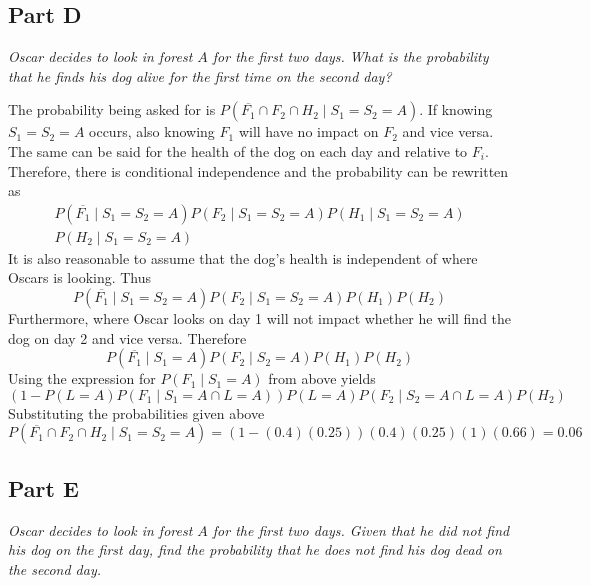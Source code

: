 \documentclass{article}
\begin{document}
\subsection*{Part D}

\textit{Oscar decides to look in forest $ A $ for the first two days. What is
the probability that he finds his dog alive for the first time on the second
day?}

\bigbreak

The probability being asked for is $ P ( \overline{F_1} \cap F_2 \cap H_2 \mid
S_1 = S_2 = A) $. If knowing $ S_1 = S_2 = A $ occurs, also knowing $ F_1 $ will
have no impact on $ F_2 $ and vice versa. The same can be said for the health of
the dog on each day and relative to $ F_i $. Therefore, there is conditional
independence and the probability can be rewritten as
\begin{align*}
    P(\overline{F_1} \mid S_1 = S_2 = A) P(F_2 \mid S_1 = S_2 = A) P(H_1 \mid
    S_1 = S_2 = A) \\
    P(H_2 \mid S_1 = S_2 = A)
\end{align*}
It is also reasonable to assume that the dog's health is independent of where
Oscars is looking. Thus
$$ P(\overline{F_1} \mid S_1 = S_2 = A) P(F_2 \mid S_1 = S_2 = A) P(H_1) P(H_2)
$$
Furthermore, where Oscar looks on day 1 will not impact whether he will find the
dog on day 2 and vice versa. Therefore
$$ P(\overline{F_1} \mid S_1 = A) P(F_2 \mid S_2 = A) P(H_1) P(H_2) $$
Using the expression for $ P(F_1 \mid S_1 = A) $ from above yields
$$ (1 - P(L = A)P(F_1 \mid S_1 = A \cap L = A)) P(L = A) P(F_2 \mid S_2 = A \cap
L = A) P(H_2) $$
Substituting the probabilities given above
$$ P ( \overline{F_1} \cap F_2 \cap H_2 \mid S_1 = S_2 = A) = (1 -
(0.4)(0.25))(0.4)(0.25)(1)(0.66) = 0.06 $$

\subsection*{Part E}

\textit{Oscar decides to look in forest $ A $ for the first two days. Given that
he did not find his dog on the first day, find the probability that he does not
find his dog dead on the second day.}

\bigbreak
\end{document}
